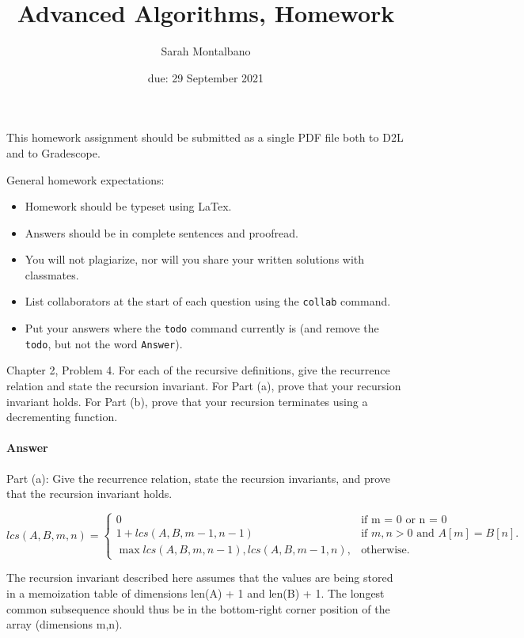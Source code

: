 \documentclass{article}
\title{Advanced Algorithms, Homework \hwnum}
\author{Sarah Montalbano}
\date{due: 29 September 2021}
\begin{document}
\maketitle

This homework assignment should be
submitted as a single PDF file both to D2L and to Gradescope.

General homework expectations:
\begin{itemize}
    \item Homework should be typeset using LaTex.
    \item Answers should be in complete sentences and proofread.
    \item You will not plagiarize, nor will you share your written solutions
        with classmates.
    \item List collaborators at the start of each question using the
        \texttt{collab} command.
    \item Put your answers where the \texttt{todo} command currently is (and
        remove the \texttt{todo}, but not the word \texttt{Answer}).
\end{itemize}




Chapter 2, Problem 4. For each of the recursive definitions, give the recurrence
relation and state the recursion invariant. For Part (a), prove that your
recursion invariant holds.  For Part (b), prove that your recursion terminates
using a decrementing function.

\paragraph{Answer}{Part (a): Give the recurrence relation, state the recursion invariants, and prove that the recursion invariant holds.

\begin{equation}
lcs(A, B, m, n) = 
\begin{cases}
    0 & \text{if m = 0 or n = 0}\\
    1 + lcs(A, B, m - 1, n -1) & \text{if $m, n > 0$ and $A[m] = B[n]$}.\\
    \max{lcs(A, B, m, n-1), lcs(A, B, m-1, n)}, & \text{otherwise}.
  \end{cases}
\end{equation}}

The recursion invariant described here assumes that the values are being stored in a memoization table of dimensions len(A) + 1 and len(B) + 1. The longest common subsequence should thus be in the bottom-right corner position of the array (dimensions m,n). 
\end{document}
